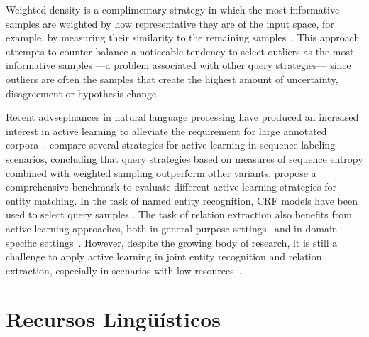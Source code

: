 Weighted density is a complimentary strategy in which the most informative samples are weighted by how representative they are of the input space, for example, by measuring their similarity to the remaining samples~\cite{settles2008analysis}.
This approach attempts to counter-balance a noticeable tendency to select outliers as the most informative samples ---a problem associated with other query strategies--- since outliers are often the samples that create the highest amount of uncertainty, disagreement or hypothesis change.

Recent advseplnances in natural language processing have produced an increased interest in active learning to alleviate the requirement for large annotated corpora~\cite{Olsson2009ALS, Tchoua2019ActiveLY}.
\citet{settles2008analysis} compare several strategies for active learning in sequence labeling scenarios, concluding that query strategies based on measures of sequence entropy combined with weighted sampling outperform other variants.
\citet{Meduri2020ACB} propose a comprehensive benchmark to evaluate different active learning strategies for entity matching.
In the task of named entity recognition, CRF models have been used to select query samples
\citep{Claveau2017StrategiesTS, Lin2019AlpacaTagAA}.
The task of relation extraction also benefits from active learning approaches, both in general-purpose settings~\cite{fu2013efficient} and in domain-specific settings~\cite{zhang2012unified}.
However, despite the growing body of research, it is still a challenge to apply active learning in joint entity recognition and relation extraction, especially in scenarios with low resources~\cite{Gao2019ActiveER}.

  \section{Recursos Lingüísticos}


